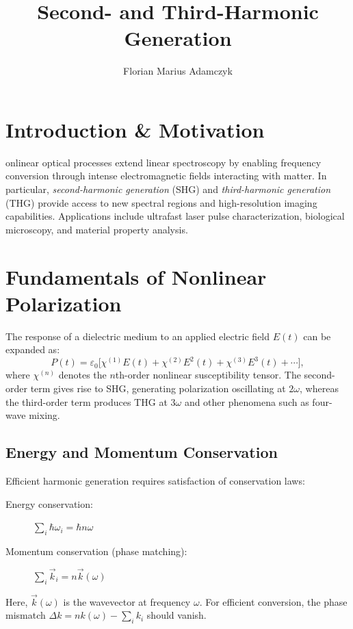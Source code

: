 \documentclass[9pt,a4paper,twocolumn,twoside]{tau-class/tau}
\title{Second- and Third-Harmonic Generation}
\author[a,1]{Florian Marius Adamczyk}
\affil[a]{Justus-Liebig-Universität Gießen, Institute of Physics, Germany}
\begin{document}
		
    \maketitle 
    \thispagestyle{firststyle} 
    \tauabstract 
    

\section{Introduction \& Motivation}
    onlinear optical processes extend linear spectroscopy by enabling frequency conversion through intense electromagnetic fields interacting with matter. In particular, \emph{second-harmonic generation} (SHG) and \emph{third-harmonic generation} (THG) provide access to new spectral regions and high-resolution imaging capabilities. Applications include ultrafast laser pulse characterization, biological microscopy, and material property analysis.

\section{Fundamentals of Nonlinear Polarization}
The response of a dielectric medium to an applied electric field $E(t)$ can be expanded as:
\begin{equation}
P(t) = \varepsilon_0\bigl[\chi^{(1)}E(t) + \chi^{(2)}E^2(t) + \chi^{(3)}E^3(t) + \cdots\bigr],
\end{equation}
where $\chi^{(n)}$ denotes the $n$th-order nonlinear susceptibility tensor. The second-order term gives rise to SHG, generating polarization oscillating at $2\omega$, whereas the third-order term produces THG at $3\omega$ and other phenomena such as four-wave mixing.

\subsection{Energy and Momentum Conservation}
Efficient harmonic generation requires satisfaction of conservation laws:
\begin{description}
    \item[Energy conservation:] \hspace{0.5em} $\displaystyle \sum_i \hbar \omega_i = \hbar n\omega$
    \item[Momentum conservation (phase matching):] \hspace{0.5em} $\displaystyle \sum_i \vec{k}_i = n\vec{k}(\omega)$
\end{description}
Here, $\vec{k}(\omega)$ is the wavevector at frequency $\omega$. For efficient conversion, the phase mismatch $\Delta k = n k(\omega) - \sum_i k_i$ should vanish.
\end{document}

